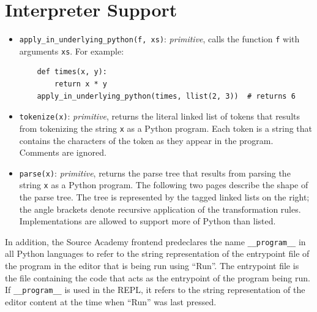 \section*{Interpreter Support}

\begin{itemize}
  \item \lstinline{apply_in_underlying_python(f, xs)}: \textit{primitive}, calls the function \lstinline{f}
    with arguments \lstinline{xs}. For example:
    \begin{lstlisting}
    def times(x, y):
        return x * y
    apply_in_underlying_python(times, llist(2, 3))  # returns 6
    \end{lstlisting}
  \item \lstinline{tokenize(x)}: \textit{primitive}, returns the literal linked list of tokens that results from tokenizing
    the string \lstinline{x} as a Python program. Each token is a string that contains the characters of
    the token as they appear in the program. Comments are ignored.
  \item \lstinline{parse(x)}: \textit{primitive}, returns the parse tree that results from parsing
    the string \lstinline{x} as a Python program. The following two pages describe the shape of the parse tree.
    The tree is represented by the tagged linked lists on the right; the angle brackets denote recursive application
    of the transformation rules. Implementations are allowed to support more of Python than listed.
\end{itemize}

In addition, the Source Academy frontend predeclares the name \lstinline{__program__} in all Python languages to
refer to the string representation of the entrypoint file of the program in the editor that is being run using ``Run''.
The entrypoint file is the file containing the code that acts as the entrypoint of the program being run.
If \lstinline{__program__} is used in the REPL, it refers to the string representation of the editor content
at the time when ``Run'' was last pressed.

\newpage
{}
\recalctypearea
  \addtolength{\oddsidemargin}{-6cm}
  \addtolength{\evensidemargin}{-6cm}
  \addtolength{\textwidth}{13cm}

